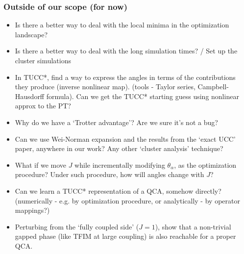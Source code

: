\documentclass[10pt, a4paper]{article}
\begin{document}
\subsubsection*{Outside of our scope (for now)}
\begin{itemize}

\item Is there a better way to deal with the local minima in the optimization landscape?
\item Is there a better way to deal with the long simulation times? / Set up the cluster simulations
\item In TUCC*, find a way to express the angles in terms of the contributions they produce (inverse nonlinear map). (tools - Taylor series, Campbell-Hausdorff formula). Can we get the TUCC* starting guess using nonlinear approx to the PT?
\item Why do we have a `Trotter advantage'? Are we sure it's not a bug?
\item Can we use Wei-Norman expansion and the results from the `exact UCC' paper, anywhere in our work? Any other `cluster analysis' technique?
\item What if we move $J$ while incrementally modifying $\theta_{\alpha}$, as the optimization procedure? Under such procedure, how will angles change with $J$?
\item Can we learn a TUCC* representation of a QCA, somehow directly? (numerically - e.g. by optimization procedure, or analytically - by operator mappings?)

\item Perturbing from the `fully coupled side' ($J=1$), show that a non-trivial gapped phase (like TFIM at large coupling) is also reachable for a proper QCA.

\end{itemize}
\end{document}
